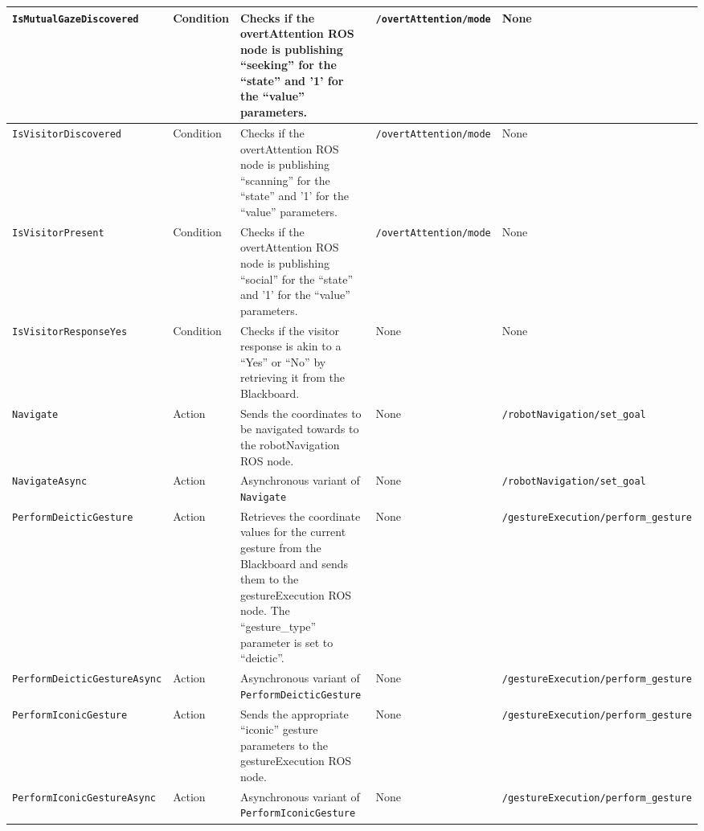 \documentclass{CSSRforAfrica}
\begin{document}
\begin{landscape}
{\begin{longtable}[c]{|p{4.8cm}|p{1.4cm}|p{4cm}|p{3.8cm}|p{6.6cm}|}
    \texttt{\footnotesize IsMutualGazeDiscovered} & Condition & Checks if the overtAttention ROS node is publishing ``seeking'' for the ``state'' and '1' for the ``value'' parameters. & \texttt{\footnotesize /overtAttention/mode} & None \\ \hline
    \texttt{\footnotesize IsVisitorDiscovered} & Condition & Checks if the overtAttention ROS node is publishing ``scanning'' for the ``state'' and '1' for the ``value'' parameters. & \texttt{{\footnotesize /overtAttention/mode}} & None \\ \hline
    \texttt{\footnotesize IsVisitorPresent} & Condition & Checks if the overtAttention ROS node is publishing ``social'' for the ``state'' and '1' for the ``value'' parameters. & \texttt{\footnotesize /overtAttention/mode} & None \\ \hline
    \texttt{\footnotesize IsVisitorResponseYes} & Condition & Checks if the visitor response is akin to a ``Yes'' or ``No'' by retrieving it from the Blackboard. & None & None \\ \hline
    \texttt{\footnotesize Navigate} & Action & Sends the coordinates to be navigated towards to the robotNavigation ROS node. & None & \texttt{\footnotesize /robotNavigation/set\_goal} \\ \hline
    \texttt{\footnotesize NavigateAsync} & Action & Asynchronous variant of \texttt{\footnotesize Navigate} & None & \texttt{\footnotesize /robotNavigation/set\_goal} \\ \hline
    \texttt{\footnotesize PerformDeicticGesture} & Action & Retrieves the coordinate values for the current gesture from the Blackboard and sends them to the gestureExecution ROS node. The ``gesture\_type'' parameter is set to ``deictic''. & None & \texttt{\footnotesize /gestureExecution/perform\_gesture} \\ \hline
    \texttt{\footnotesize PerformDeicticGestureAsync} & Action & Asynchronous variant of \texttt{\footnotesize PerformDeicticGesture} & None & \texttt{\footnotesize /gestureExecution/perform\_gesture} \\ \hline
    \texttt{\footnotesize PerformIconicGesture} & Action & Sends the appropriate ``iconic'' gesture parameters to the gestureExecution ROS node. & None & \texttt{\footnotesize /gestureExecution/perform\_gesture} \\ \hline
    \texttt{\footnotesize PerformIconicGestureAsync} & Action & Asynchronous variant of \texttt{\footnotesize PerformIconicGesture} & None & \texttt{\footnotesize /gestureExecution/perform\_gesture} \\ \hline

\end{longtable}}
\end{landscape}
\end{document}
